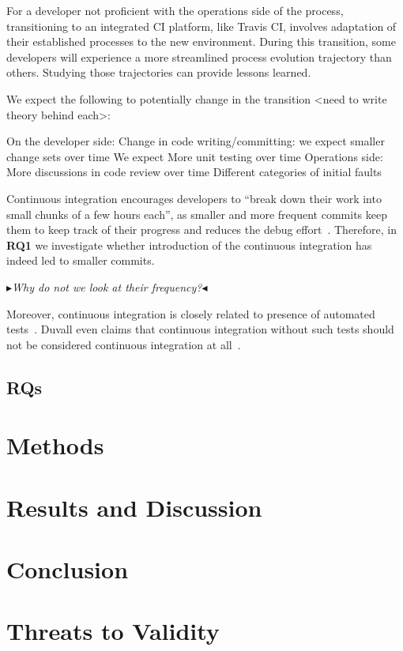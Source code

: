 \documentclass[conference]{IEEEtran}
\newcommand{\nnbb}[2]{
    \fbox{\bfseries\sffamily\scriptsize#1}
    {\sf\small$\blacktriangleright$\textit{#2}$\blacktriangleleft$}
   }
\newcommand{\as}[1]{\nnbb{Alexander}{#1}}
\begin{document}
For a developer not proficient with the operations side of the process, transitioning to an integrated CI platform, like Travis CI, involves adaptation of their established processes to the new environment. During this transition, some developers will experience a more streamlined process evolution trajectory than others. Studying those trajectories can provide lessons learned.


We expect the following to potentially change in the transition <need to write theory behind each>:

On the developer side:
Change in code writing/committing: we expect smaller change sets over time
We expect More unit testing over time
Operations side:
More discussions in code review over time
Different categories of initial faults

Continuous integration encourages developers to ``break down their work into small chunks of a few hours each'', as smaller and more frequent commits keep them to keep track of their progress and reduces the debug effort~\cite{Fowler,Duvall}. %
Therefore, in \textbf{RQ1} we investigate whether introduction of the continuous integration has indeed led to smaller commits.
\as{Why do not we look at their frequency?}

Moreover, continuous integration is closely related to presence of automated tests~\cite{Fowler}. Duvall even claims that continuous integration without such tests should not be considered continuous integration at all~\cite{Duvall}.

\subsection{RQs}

\section{Methods}

\section{Results and Discussion}





\section{Conclusion}

\section{Threats to Validity}



\end{document}
